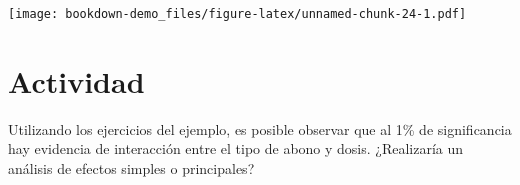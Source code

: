 \documentclass[]{book}
\newenvironment{Shaded}{\begin{snugshade}}{\end{snugshade}}
\newcommand{\KeywordTok}[1]{\textcolor[rgb]{0.13,0.29,0.53}{\textbf{#1}}}
\newcommand{\DataTypeTok}[1]{\textcolor[rgb]{0.13,0.29,0.53}{#1}}
\newcommand{\DecValTok}[1]{\textcolor[rgb]{0.00,0.00,0.81}{#1}}
\newcommand{\StringTok}[1]{\textcolor[rgb]{0.31,0.60,0.02}{#1}}
\newcommand{\OperatorTok}[1]{\textcolor[rgb]{0.81,0.36,0.00}{\textbf{#1}}}
\newcommand{\NormalTok}[1]{#1}
\begin{document}
\begin{Shaded}
\end{Shaded}

\texttt{[image: bookdown-demo\_files/figure-latex/unnamed-chunk-24-1.pdf]}

\section{Actividad}\label{actividad-5}

Utilizando los ejercicios del ejemplo, es posible observar que al 1\% de
significancia hay evidencia de interacción entre el tipo de abono y
dosis. ¿Realizaría un análisis de efectos simples o principales?


\end{document}
